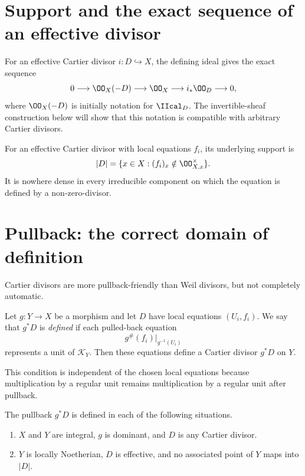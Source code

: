 \section{Support and the exact sequence of an effective divisor}
For an effective Cartier divisor \(i:D\hookrightarrow X\), the defining ideal gives the exact sequence
\[
 0\longrightarrow\OO_X(-D)
 \longrightarrow\OO_X
 \longrightarrow i_*\OO_D
 \longrightarrow0,
\]
where \(\OO_X(-D)\) is initially notation for \(\IIcal_D\).  The invertible-sheaf construction below will show that this notation is compatible with arbitrary Cartier divisors.

\begin{proposition}[Support]\label{prop:vi40-support-effective}
For an effective Cartier divisor with local equations \(f_i\), its underlying support is
\[
 |D|=\{x\in X:(f_i)_x\notin\OO_{X,x}^\times\}.
\]
It is nowhere dense in every irreducible component on which the equation is defined by a non-zero-divisor.
\end{proposition}

\section{Pullback: the correct domain of definition}
Cartier divisors are more pullback-friendly than Weil divisors, but not completely automatic.

\begin{definition}\label{def:vi40-pullback-defined}
Let \(g:Y\to X\) be a morphism and let \(D\) have local equations \((U_i,f_i)\).  We say that \(g^*D\) is \emph{defined} if each pulled-back equation
\[
 g^\#(f_i)|_{g^{-1}(U_i)}
\]
represents a unit of \(\mathcal K_Y\).  Then these equations define a Cartier divisor \(g^*D\) on \(Y\).
\end{definition}

This condition is independent of the chosen local equations because multiplication by a regular unit remains multiplication by a regular unit after pullback.

\begin{proposition}\label{prop:vi40-pullback-criteria}
The pullback \(g^*D\) is defined in each of the following situations.
\begin{enumerate}[label=(\alph*)]
\item \(X\) and \(Y\) are integral, \(g\) is dominant, and \(D\) is any Cartier divisor.
\item \(Y\) is locally Noetherian, \(D\) is effective, and no associated point of \(Y\) maps into \(|D|\).
\end{enumerate}
\end{proposition}

